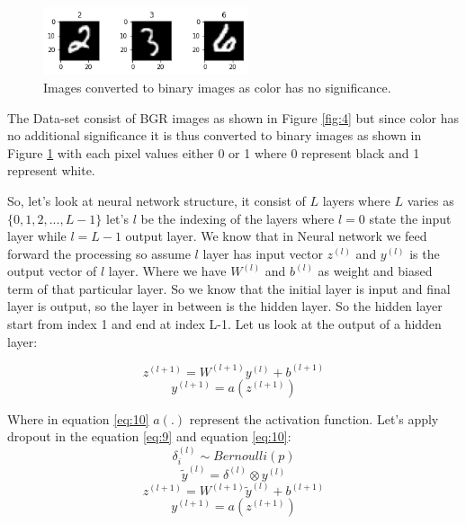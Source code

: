 \documentclass{article}
\begin{document}
\begin{multicols}{2}
\begin{figure}[H]
    \centering
    \includegraphics[width=6cm]{images/img1.png}
    \caption{Images converted to binary images as color has no significance.}
    \label{fig:5}
\end{figure}

The Data-set consist of BGR images as shown in Figure \ref{fig:4} but since color has no additional significance it is thus converted to binary images as shown in Figure \ref{fig:5} with each pixel values either 0 or 1 where 0 represent black and 1 represent white.

So, let's look at neural network structure, it consist of $L$ layers where $L$ varies as $\{0,1,2,...,L-1\}$ let's $l$ be the indexing of the layers where $l=0$ state the input layer while $l = L-1$  output layer. We know that in Neural network we feed forward the processing so assume $l$ layer has input vector $z^{(l)}$ and $y^{(l)}$ is the output vector of $l$ layer. Where we have $W^{(l)}$ and $b^{(l)}$ as weight and biased term of that particular layer. So we know that the initial layer is input and final layer is output, so the layer in between is the hidden layer. So the hidden layer start from index 1 and end at index L-1. Let us look at the output of a hidden layer:

\begin{equation}
\label{eq:9}
    z^{(l+1)} =W^{(l+1)}y^{(l)} + b^{(l+1)}
\end{equation}
\begin{equation}
\label{eq:10}
    y^{(l+1)} =a(z^{(l+1)})
\end{equation}

Where in equation \ref{eq:10} $a(.)$ represent the activation function. Let's apply dropout in the equation \ref{eq:9} and equation \ref{eq:10}:
\begin{equation}
\label{eq:11}
    \delta_i^{(l)} \sim Bernoulli(p)
\end{equation}
\begin{equation}
\label{eq:12}
    \tilde{y}^{(l)} = \delta^{(l)} \otimes y^{(l)}
\end{equation}
\begin{equation}
\label{eq:13}
     z^{(l+1)} =W^{(l+1)}\tilde{y}^{(l)} + b^{(l+1)}
\end{equation}
\begin{equation}
\label{eq:14}
    y^{(l+1)} =a(z^{(l+1)})
\end{equation}


\end{multicols}
\end{document}
